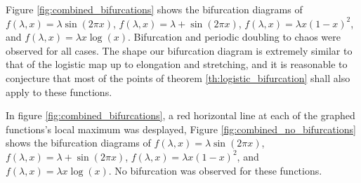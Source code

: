Figure \ref{fig:combined_bifurcations} shows the bifurcation diagrams of $f(\lambda, x) = \lambda \sin(2\pi x)$, $f(\lambda, x) = \lambda + \sin(2\pi x)$, $f(\lambda, x) = \lambda x(1-x)^2$, and $f(\lambda, x) = \lambda x \log(x)$.
Bifurcation and periodic doubling to chaos were observed for all cases. 
The shape our bifurcation diagram is extremely similar to that of the logistic map up to elongation and stretching, and it is reasonable to conjecture that most of the points of theorem \ref{th:logistic_bifurcation} shall also apply to these functions.

In figure \ref{fig:combined_bifurcations}, a red horizontal line at each of the graphed functions's local maximum was desplayed,
Figure \ref{fig:combined_no_bifurcations} shows the bifurcation diagrams of $f(\lambda, x) = \lambda \sin(2\pi x)$, $f(\lambda, x) = \lambda + \sin(2\pi x)$, $f(\lambda, x) = \lambda x(1-x)^2$, and $f(\lambda, x) = \lambda x \log(x)$. 
No bifurcation was observed for these functions.

